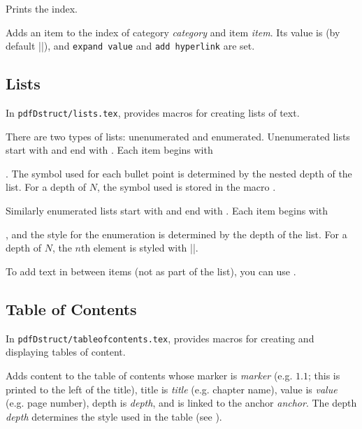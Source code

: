 \macroexp{\index}
Prints the index.
\emacroexp

Adds an item to the index of category {\it category} and item {\it item}.
Its value is \macro\@defaultindexval{} (by default \inlinecode|\the\pageno|), and {\tt expand value} and {\tt add hyperlink} are set.
\emacroexp

\subsection{Lists}

In {\tt pdfDstruct/lists.tex}, \pdftoolbox{} provides macros for creating lists of text.

There are two types of lists: unenumerated and enumerated.
Unenumerated lists start with \macro\blist\anchormacro\blist{} and end with \macro\elist\anchormacro\elist.
Each item begins with \macro\item\anchormacro\item.
The symbol used for each bullet point is determined by the nested depth of the list.
For a depth of $N$, the symbol used is stored in the macro \macro\liststyleN\anchormacro\liststyle.

Similarly enumerated lists start with \macro\benum\anchormacro\benum{} and end with \macro\elist\anchormacro\eenum.
Each item begins with \macro\item, and the style for the enumeration is determined by the depth of the list.
For a depth of $N$, the $n$th element is styled with \inlinecode||.

To add text in between items (not as part of the list), you can use \macro\mtext\anchormacro\mtext.

\subsection{Table of Contents}

In {\tt pdfDstruct/tableofcontents.tex}, \pdftoolbox{} provides macros for creating and displaying tables of content.

Adds content to the table of contents whose marker is {\it marker} (e.g. $1.1$; this is printed to the left of the title), title is {\it title} (e.g. chapter name), value is {\it value} (e.g. page number), depth is {\it depth},
and is linked to the anchor {\it anchor}.
The depth {\it depth} determines the style used in the table (see \gotomacro\settocdepthformat).
\emacroexp


